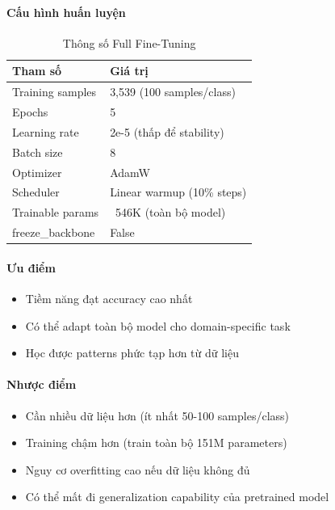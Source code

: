 \paragraph{Cấu hình huấn luyện}
\begin{table}[H]
    \centering
    \caption{Thông số Full Fine-Tuning}
    \begin{tabular}{|l|l|}
        \hline
        \textbf{Tham số} & \textbf{Giá trị} \\
        \hline
        Training samples & 3,539 (100 samples/class) \\
        \hline
        Epochs & 5 \\
        \hline
        Learning rate & 2e-5 (thấp để stability) \\
        \hline
        Batch size & 8 \\
        \hline
        Optimizer & AdamW \\
        \hline
        Scheduler & Linear warmup (10\% steps) \\
        \hline
        Trainable params & ~546K (toàn bộ model) \\
        \hline
        freeze\_backbone & False \\
        \hline
    \end{tabular}
    \label{tab:full-finetune-config}
\end{table}

\paragraph{Ưu điểm}
\begin{itemize}
    \item Tiềm năng đạt accuracy cao nhất
    \item Có thể adapt toàn bộ model cho domain-specific task
    \item Học được patterns phức tạp hơn từ dữ liệu
\end{itemize}

\paragraph{Nhược điểm}
\begin{itemize}
    \item Cần nhiều dữ liệu hơn (ít nhất 50-100 samples/class)
    \item Training chậm hơn (train toàn bộ 151M parameters)
    \item Nguy cơ overfitting cao nếu dữ liệu không đủ
    \item Có thể mất đi generalization capability của pretrained model
\end{itemize}

